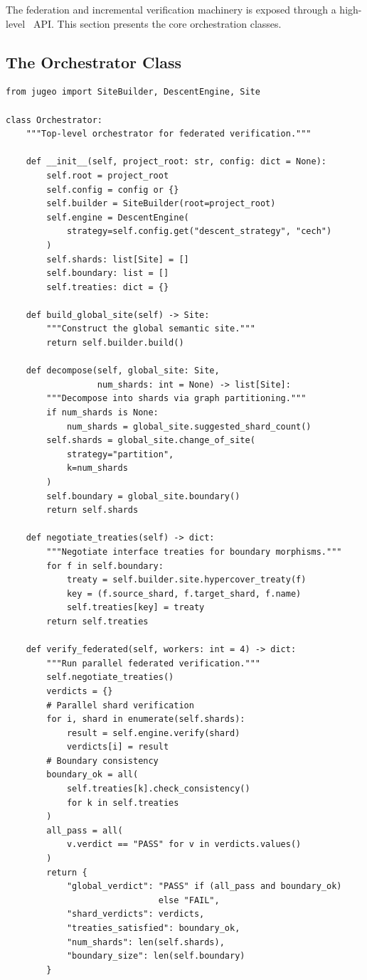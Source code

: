 \documentclass[11pt]{article}
\begin{document}
The federation and incremental verification machinery is exposed
through a high-level \Python\ API.  This section presents the
core orchestration classes.

\subsection{The Orchestrator Class}

\begin{lstlisting}[style=jugeo-python]
from jugeo import SiteBuilder, DescentEngine, Site

class Orchestrator:
    """Top-level orchestrator for federated verification."""
    
    def __init__(self, project_root: str, config: dict = None):
        self.root = project_root
        self.config = config or {}
        self.builder = SiteBuilder(root=project_root)
        self.engine = DescentEngine(
            strategy=self.config.get("descent_strategy", "cech")
        )
        self.shards: list[Site] = []
        self.boundary: list = []
        self.treaties: dict = {}
    
    def build_global_site(self) -> Site:
        """Construct the global semantic site."""
        return self.builder.build()
    
    def decompose(self, global_site: Site,
                  num_shards: int = None) -> list[Site]:
        """Decompose into shards via graph partitioning."""
        if num_shards is None:
            num_shards = global_site.suggested_shard_count()
        self.shards = global_site.change_of_site(
            strategy="partition",
            k=num_shards
        )
        self.boundary = global_site.boundary()
        return self.shards
    
    def negotiate_treaties(self) -> dict:
        """Negotiate interface treaties for boundary morphisms."""
        for f in self.boundary:
            treaty = self.builder.site.hypercover_treaty(f)
            key = (f.source_shard, f.target_shard, f.name)
            self.treaties[key] = treaty
        return self.treaties
    
    def verify_federated(self, workers: int = 4) -> dict:
        """Run parallel federated verification."""
        self.negotiate_treaties()
        verdicts = {}
        # Parallel shard verification
        for i, shard in enumerate(self.shards):
            result = self.engine.verify(shard)
            verdicts[i] = result
        # Boundary consistency
        boundary_ok = all(
            self.treaties[k].check_consistency()
            for k in self.treaties
        )
        all_pass = all(
            v.verdict == "PASS" for v in verdicts.values()
        )
        return {
            "global_verdict": "PASS" if (all_pass and boundary_ok)
                              else "FAIL",
            "shard_verdicts": verdicts,
            "treaties_satisfied": boundary_ok,
            "num_shards": len(self.shards),
            "boundary_size": len(self.boundary)
        }
\end{lstlisting}
\end{document}

